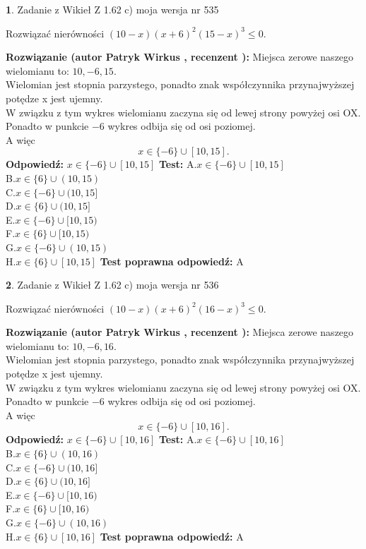 \documentclass[12pt, a4paper]{article}
\theoremstyle{definition} %
\newtheorem{zad}{}
\newcommand{\zadStart}[1]{\begin{zad}#1\newline}
\newcommand{\zadStop}{\end{zad}}
\newcommand{\rozwStart}[2]{\noindent \textbf{Rozwiązanie (autor #1 , recenzent #2): }\newline}
\newcommand{\rozwStop}{\newline}
\newcommand{\odpStart}{\noindent \textbf{Odpowiedź:}\newline}
\newcommand{\odpStop}{\newline}
\newcommand{\testStart}{\noindent \textbf{Test:}\newline}
\newcommand{\testStop}{\newline}
\newcommand{\kluczStart}{\noindent \textbf{Test poprawna odpowiedź:}\newline}
\newcommand{\kluczStop}{\newline}
\begin{document}
\zadStart{Zadanie z Wikieł Z 1.62 c) moja wersja nr 535}

Rozwiązać nierówności $(10-x)(x+6)^{2}(15-x)^{3}\le0$.
\zadStop
\rozwStart{Patryk Wirkus}{}
Miejsca zerowe naszego wielomianu to: $10, -6, 15$.\\
Wielomian jest stopnia parzystego, ponadto znak współczynnika przy\linebreak najwyższej potędze x jest ujemny.\\ W związku z tym wykres wielomianu zaczyna się od lewej strony powyżej osi OX.\\
Ponadto w punkcie $-6$ wykres odbija się od osi poziomej.\\
A więc $$x \in \{-6\} \cup [10,15].$$
\rozwStop
\odpStart
$x \in \{-6\} \cup [10,15]$
\odpStop
\testStart
A.$x \in \{-6\} \cup [10,15]$\\
B.$x \in \{6\} \cup (10,15)$\\
C.$x \in \{-6\} \cup (10,15]$\\
D.$x \in \{6\} \cup (10,15]$\\
E.$x \in \{-6\} \cup [10,15)$\\
F.$x \in \{6\} \cup [10,15)$\\
G.$x \in \{-6\} \cup (10,15)$\\
H.$x \in \{6\} \cup [10,15]$
\testStop
\kluczStart
A
\kluczStop



\zadStart{Zadanie z Wikieł Z 1.62 c) moja wersja nr 536}

Rozwiązać nierówności $(10-x)(x+6)^{2}(16-x)^{3}\le0$.
\zadStop
\rozwStart{Patryk Wirkus}{}
Miejsca zerowe naszego wielomianu to: $10, -6, 16$.\\
Wielomian jest stopnia parzystego, ponadto znak współczynnika przy\linebreak najwyższej potędze x jest ujemny.\\ W związku z tym wykres wielomianu zaczyna się od lewej strony powyżej osi OX.\\
Ponadto w punkcie $-6$ wykres odbija się od osi poziomej.\\
A więc $$x \in \{-6\} \cup [10,16].$$
\rozwStop
\odpStart
$x \in \{-6\} \cup [10,16]$
\odpStop
\testStart
A.$x \in \{-6\} \cup [10,16]$\\
B.$x \in \{6\} \cup (10,16)$\\
C.$x \in \{-6\} \cup (10,16]$\\
D.$x \in \{6\} \cup (10,16]$\\
E.$x \in \{-6\} \cup [10,16)$\\
F.$x \in \{6\} \cup [10,16)$\\
G.$x \in \{-6\} \cup (10,16)$\\
H.$x \in \{6\} \cup [10,16]$
\testStop
\kluczStart
A
\kluczStop
\end{document}
